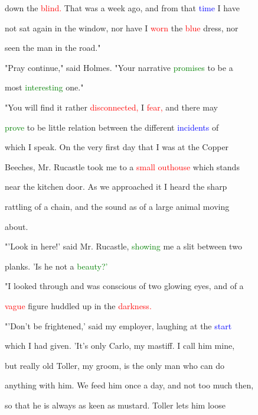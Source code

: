  down the \textcolor{red}{blind.} That was a week ago, and from that \textcolor{blue}{time} I have

 not sat again in the window, nor have I \textcolor{red}{worn} the \textcolor{red}{blue} dress, nor

 seen the man in the road."



 \textcolor{BurntOrange}{"Pray} \textcolor{BurntOrange}{continue,"} said Holmes. "Your narrative \textcolor{green}{promises} to be a

 most \textcolor{green}{interesting} one."



 "You will find it rather \textcolor{red}{disconnected,} I \textcolor{red}{fear,} and there may

 \textcolor{green}{prove} to be little relation between the different \textcolor{blue}{incidents} of

 which I speak. On the very first day that I was at the Copper

 Beeches, Mr. Rucastle took me to a \textcolor{red}{small} \textcolor{red}{outhouse} which stands

 near the kitchen door. As we approached it I heard the sharp

 rattling of a chain, and the sound as of a large animal moving

 about.



 "'Look in here!' said Mr. Rucastle, \textcolor{green}{showing} me a slit between two

 planks. 'Is he not a \textcolor{green}{beauty?'}



 "I looked through and was conscious of two \textcolor{BurntOrange}{glowing} eyes, and of a

 \textcolor{red}{vague} figure huddled up in the \textcolor{red}{darkness.}



 "'Don't be \textcolor{BurntOrange}{frightened,'} said my employer, \textcolor{BurntOrange}{laughing} at the \textcolor{blue}{start}

 which I had given. 'It's only Carlo, my mastiff. I call him mine,

 but really old Toller, my groom, is the only man who can do

 anything with him. We feed him once a day, and not too much then,

 so that he is always as keen as mustard. Toller lets him loose

